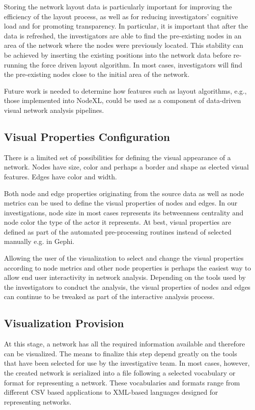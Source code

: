 Storing the network layout data is particularly important for improving the efficiency of the layout process, as well as for reducing investigators’ cognitive load and for promoting transparency. In particular, it is important that after the data is refreshed, the investigators are able to find the pre-existing nodes in an area of the network where the nodes were previously located. This stability can be achieved by inserting the existing positions into the network data before re-running the force driven layout algorithm. In most cases, investigators will find the pre-existing nodes close to the initial area of the network.

Future work is needed to determine how features such as layout algorithms, e.g., those implemented into NodeXL, could be used as a component of data-driven visual network analysis pipelines. 

\subsection{Visual Properties Configuration}

There is a limited set of possibilities for defining the visual appearance of a network. Nodes have size, color and perhaps a border and shape as elected visual features. Edges have color and width.

Both node and edge properties originating from the source data as well as node metrics can be used to define the visual properties of nodes and edges. In our investigations, node size in most cases represents its betweenness centrality and node color the type of the actor it represents. At best, visual properties are defined as part of the automated pre-processing routines instead of selected manually e.g. in Gephi.

Allowing the user of the visualization to select and change the visual properties according to node metrics and other node properties is perhaps the easiest way to allow end user interactivity in network analysis. Depending on the tools used by the investigators to conduct the analysis, the visual properties of nodes and edges can continue to be tweaked as part of the interactive analysis process.

\subsection{Visualization Provision}

At this stage, a network has all the required information available and therefore can be visualized. The means to finalize this step depend greatly on the tools that have been selected for use by the investigative team. In most cases, however, the created network is serialized into a file following a selected vocabulary or format for representing a network. These vocabularies and formats range from different CSV based applications to XML-based languages designed for representing networks.

